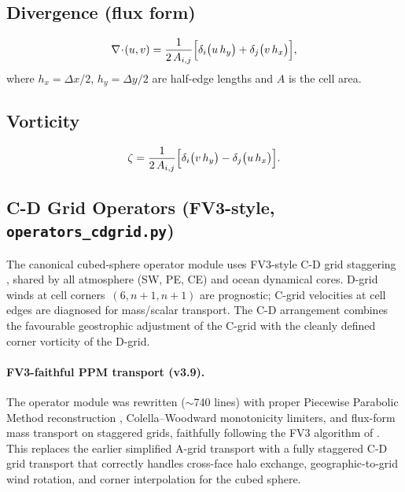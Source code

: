 \documentclass[11pt,a4paper]{article}
\begin{document}
\subsection{Divergence (flux form)}
\begin{equation}
  \nabla\!\cdot\!(u,v) = \frac{1}{2\,A_{i,j}}
  \Bigl[\delta_i\bigl(u\,h_y\bigr)+\delta_j\bigl(v\,h_x\bigr)\Bigr],
\end{equation}
where $h_x=\Delta x/2$, $h_y=\Delta y/2$ are half-edge lengths and $A$ is the cell area.

\subsection{Vorticity}
\begin{equation}
  \zeta = \frac{1}{2\,A_{i,j}}
  \Bigl[\delta_i\bigl(v\,h_y\bigr)-\delta_j\bigl(u\,h_x\bigr)\Bigr].
\end{equation}

\subsection{C-D Grid Operators (FV3-style, \texttt{operators\_cdgrid.py})}

The canonical cubed-sphere operator module uses FV3-style C-D grid staggering \citep{Lin2004,PutmanLin2007}, shared by all atmosphere (SW, PE, CE) and ocean dynamical cores.  D-grid winds at cell corners~$(6,n\!+\!1,n\!+\!1)$ are prognostic; C-grid velocities at cell edges are diagnosed for mass/scalar transport.  The C-D arrangement combines the favourable geostrophic adjustment of the C-grid with the cleanly defined corner vorticity of the D-grid.

\paragraph{FV3-faithful PPM transport (v3.9).}
The operator module was rewritten (${\sim}$740 lines) with proper Piecewise Parabolic Method reconstruction \citep{ColellaWoodward1984}, Colella--Woodward monotonicity limiters, and flux-form mass transport on staggered grids, faithfully following the FV3 algorithm of \citet{PutmanLin2007}.  This replaces the earlier simplified A-grid transport with a fully staggered C-D grid transport that correctly handles cross-face halo exchange, geographic-to-grid wind rotation, and corner interpolation for the cubed sphere.
\end{document}
